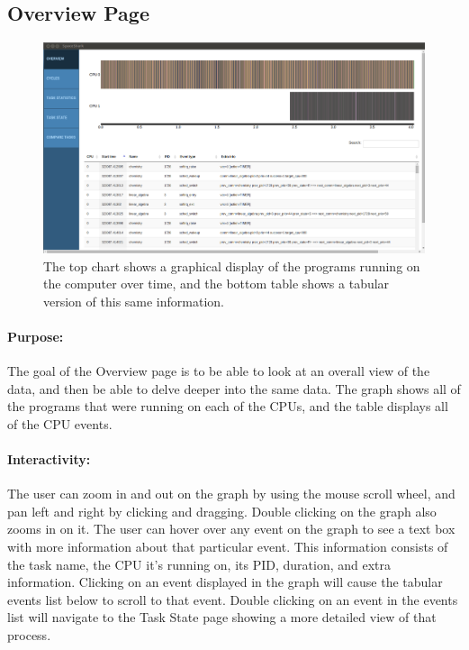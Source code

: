 \documentclass{hmcclinic}
\begin{document}

  \subsection{Overview Page} 
  
  \begin{figure}[H]
  \centering
      \includegraphics[width=5in]{overview-page.png}
  \caption{The top chart shows a graphical display of the programs running on the computer over time, and the bottom table shows a tabular version of this same information.}
  \end{figure}

\paragraph{Purpose:} 
The goal of the Overview page is to be able to look at an overall view
of the data, and then be able to delve deeper into the
same data. The graph shows all of 
the programs that were running on each of the CPUs, and the table displays 
all of the CPU events.

\paragraph{Interactivity:} The user can zoom in and out on the graph by using
the mouse scroll wheel, and pan left and right by clicking and dragging. Double
clicking on the graph also zooms in on it. The user can hover over any event on
the graph to see a text box with more information about that particular event.
This information consists of the task name, the CPU it's running on, its PID,
duration, and extra information. Clicking on an event displayed in the graph
will cause the tabular events list below to scroll to that event. Double
clicking on an event in the events list will navigate to the Task State page
showing a more detailed view of that process.
\end{document}
